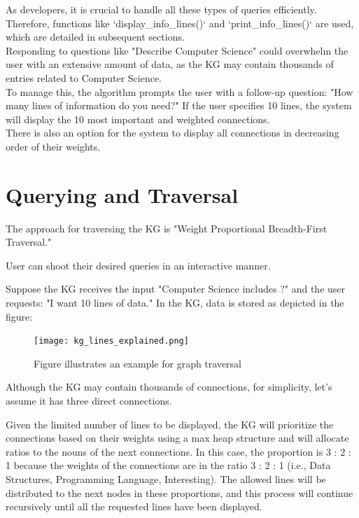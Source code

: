 \documentclass[conference]{IEEEtran}
\begin{document}
As developers, it is crucial to handle all these types of queries efficiently. Therefore, functions like `display\_info\_lines()` and `print\_info\_lines()` are used, which are detailed in subsequent sections.
\\

Responding to questions like "Describe Computer Science" could overwhelm the user with an extensive amount of data, as the KG may contain thousands of entries related to Computer Science. \\
To manage this, the algorithm prompts the user with a follow-up question: "How many lines of information do you need?" If the user specifies 10 lines, the system will display the 10 most important and weighted connections. 
\\
There is also an option for the system to display all connections in decreasing order of their weights.


\section{Querying and Traversal}


The approach for traversing the KG is "Weight Proportional Breadth-First 
Traversal."

User can shoot their desired queries in an interactive manner. 

Suppose the KG receives the input "Computer Science includes ?" and the user requests: "I want 10 lines of data."
In the KG, data is stored as depicted in the figure:

\begin{figure}[htbp]
\centering
\texttt{[image: kg\_lines\_explained.png]} %
\caption{Figure illustrates an example for graph traversal}
\label{fig}
\end{figure}



Although the KG may contain thousands of connections, for simplicity, let's assume it has three direct connections.

Given the limited number of lines to be displayed, the KG will prioritize the connections based on their weights using a max heap structure and will allocate ratios to the nouns of the next connections. In this case, the proportion is 3 : 2 : 1 
because the weights of the connections are in the ratio 3 : 2 : 1 (i.e., Data Structures, Programming Language, Interesting). The allowed lines will be distributed to the next nodes in these proportions, and this process will continue recursively until all the requested lines have been displayed.\\
\end{document}
